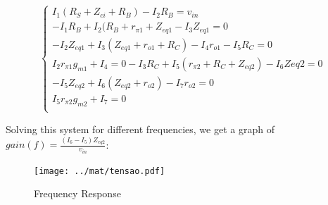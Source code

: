 \begin{equation}\label{eq:freq}
\begin{cases}
I_1 (R_S+Z_{ci}+R_B) - I_2 R_B = v_{in}\\
-I_1 R_B +I_2 (R_B+r_{\pi 1} + Z_{eq1} -I_3 Z_{eq1} = 0\\
-I_2 Z_{eq1} + I_3 (Z_{eq1} + r_{o1} + R_C) -I_4 r_{o1} - I_5 R_C =0\\
I_2 r_{\pi 1} g_{m1} + I_4 = 0
-I_3 R_C + I_5 (r_{\pi 2} + R_C + Z_{eq2}) - I_6 Z{eq2} = 0\\
-I_5 Z_{eq2}+ I_6 (Z_{eq2} + r_{o2}) - I_7 r_{o2} =0\\
I_5 r_{\pi 2} g_{m2} +I_7 = 0\\
\end{cases}
\end{equation}

Solving this system for different frequencies, we get a graph of $gain(f)= \frac{(I_6 - I_5) Z_{eq2}}{v_{in}}$:

\begin{figure}[H] \centering
\texttt{[image: ../mat/tensao.pdf]}
\caption{Frequency Response}
\label{fig:freq}
\end{figure}


